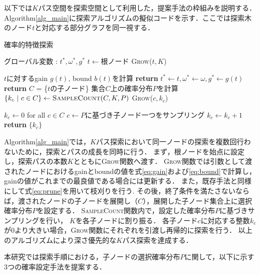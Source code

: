以下では$K$パス空間を探索空間として利用した，提案手法の枠組みを説明する．
Algorithm\ref{alg_main}に探索アルゴリズムの擬似コードを示す．ここでは探索木のノード$t$と対応する部分グラフを同一視する．
\begin{algorithm}
	\small 
	\caption{確率的特徴探索}\label{alg_main}
	\begin{algorithmic}[1]
		\State グローバル変数 : $t^*,\omega^*,g^*$
		\State $t \gets \text{根ノード}$ 
		\State \textsc{Grow}($t,K$)
		\EndProcedure

		\State $t$に対するgain $g(t)$, bound $b(t)$を計算
		\State \textbf{return}
		\EndIf
		\State $t^* \gets t,\omega^* \gets \omega,g^* \gets g(t)$
		\EndIf
		\State \textbf{return}
		\EndIf
		\State$C$ = \{$t$の子ノード\}
		\State 集合$C$上の確率分布$P$を計算 
		\State $\{k_c \ | \ c \in C\} \gets \textsc{SampleCount}(C,K,P)$
		\State \textsc{Grow}($c,k_c$)
		\EndIf
		\EndFor
		\EndFunction

		\State $k_c \gets 0$ for all $c \in C$ 
		\State $c \gets \text{$P$に基づき子ノード一つをサンプリング} $
		\State $k_c \gets k_c + 1$
		\EndFor
		\State \textbf{return} $\{k_c\}$
		\EndFunction
	\end{algorithmic}
\end{algorithm}

Algorithm\ref{alg_main}では，$K$パス探索において同一ノードの探索を複数回行わないために，探索とパスの成長を同時に行う．
まず，根ノードを始点に設定し，探索パスの本数$K$とともに\textsc{Grow}関数へ渡す．
\textsc{Grow}関数では引数として渡されたノードにおけるgainとboundの値を式\eqref{eq:gain}および\eqref{eq:bound}で計算し，gainの値がこれまでの最良値である場合には更新する．
また，既存手法と同様にして式\eqref{eq:prune}を用いて枝刈りを行う.
その後，終了条件を満たさないならば，渡されたノードの子ノードを展開し（$C$），展開した子ノード集合上に選択確率分布$P$を設定する．
\textsc{SampleCount}関数内で，設定した確率分布$P$に基づきサンプリングを行い， $K$を各子ノードに割り振る．
各子ノード$c$に対応する整数$k_c$が$0$より大きい場合，\textsc{Grow}関数にそれぞれを引渡し再帰的に探索を行う．
以上のアルゴリズムにより深さ優先的な$K$パス探索を達成する．

本研究では探索手順における，子ノードの選択確率分布$P$に関して，以下に示す3つの確率設定手法を提案する．

